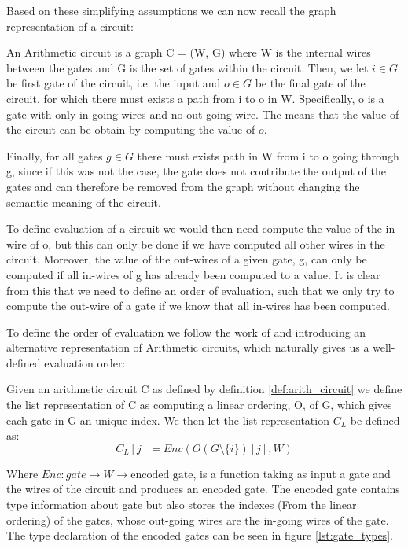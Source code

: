 Based on these simplifying assumptions we can now recall the graph
representation of a circuit:
\begin{definition}
  \label{def:arith_circuit}
  An Arithmetic circuit is a graph C = (W, G) where W is the internal
  wires between the gates and G is the set of gates within the circuit. Then,
  we let $i \in G$ be first gate of the circuit, i.e. the input and $o \in G$ be the final
  gate of the circuit, for which there must exists a path from i to o in W.
  Specifically, o is a gate with only in-going wires and no out-going wire.
  The means that the value of the circuit can be obtain by computing the value
  of $o$.

  Finally, for all gates $g \in G$ there must exists path in W from i to o going
  through g,
  since if this was not the case, the gate does not contribute the output of the
  gates and can therefore be removed from the graph without changing the
  semantic meaning of the circuit.
\end{definition}

To define evaluation of a circuit we would then need compute the value of the
in-wire of o, but this can only be done if we have computed all other wires in
the circuit. Moreover, the value of the out-wires of a given gate, g, can only
be computed if all in-wires of g has already been computed to a value. It is
clear from this that we need to define an order of evaluation, such that we only
try to compute the out-wire of a gate if we know that all in-wires has been computed.

To define the order of evaluation we follow the work of \cite{Yao} and introducing an alternative
representation of Arithmetic circuits, which naturally gives us a well-defined
evaluation order:

\begin{definition}
  Given an arithmetic circuit C as defined by definition \ref{def:arith_circuit}
  we define the list representation of C as computing a linear ordering, O, of
  G, which gives each gate in G an unique index.
  We then let the list representation $C_{L}$ be defined as:
  \[
    C_{L}[j] = Enc(O( G \setminus \{i\})[j], W)
  \]

  Where $Enc : gate \rightarrow W \rightarrow \text{encoded gate}$, is a function
  taking as input a gate and the wires of the circuit and produces an encoded
  gate.
  The encoded gate contains type information about gate but also stores the
  indexes (From the linear ordering) of the gates, whose out-going wires are the
  in-going wires of the gate.
  The type declaration of the encoded gates can be seen in figure \ref{lst:gate_types}.
\end{definition}

